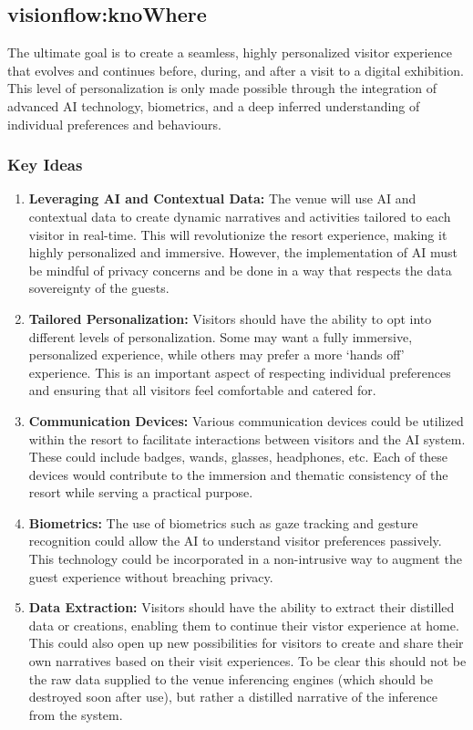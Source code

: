 \subsection{visionflow:knoWhere}

The ultimate goal is to create a seamless, highly personalized visitor experience that evolves and continues before, during, and after a visit to a digital exhibition. This level of personalization is only made possible through the integration of advanced AI technology, biometrics, and a deep inferred understanding of individual preferences and behaviours. 

\subsubsection{Key Ideas}
\begin{enumerate}
\item \textbf{Leveraging AI and Contextual Data:} The venue will use AI and contextual data to create dynamic narratives and activities tailored to each visitor in real-time. This will revolutionize the resort experience, making it highly personalized and immersive. However, the implementation of AI must be mindful of privacy concerns and be done in a way that respects the data sovereignty of the guests.
\item \textbf{Tailored Personalization:} Visitors should have the ability to opt into different levels of personalization. Some may want a fully immersive, personalized experience, while others may prefer a more `hands off' experience. This is an important aspect of respecting individual preferences and ensuring that all visitors feel comfortable and catered for.
\item \textbf{Communication Devices:} Various communication devices could be utilized within the resort to facilitate interactions between visitors and the AI system. These could include badges, wands, glasses, headphones, etc. Each of these devices would contribute to the immersion and thematic consistency of the resort while serving a practical purpose.
\item \textbf{Biometrics:} The use of biometrics such as gaze tracking and gesture recognition could allow the AI to understand visitor preferences passively. This technology could be incorporated in a non-intrusive way to augment the guest experience without breaching privacy.
\item \textbf{Data Extraction:} Visitors should have the ability to extract their distilled data or creations, enabling them to continue their vistor experience at home. This could also open up new possibilities for visitors to create and share their own narratives based on their visit experiences. To be clear this should not be the raw data supplied to the venue inferencing engines (which should be destroyed soon after use), but rather a distilled narrative of the inference from the system.

\end{enumerate}
